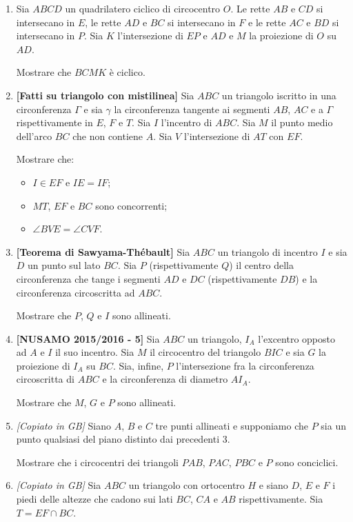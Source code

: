 \begin{enumerate}
	\item Sia $ABCD$ un quadrilatero ciclico di circocentro $O$. Le rette $AB$ e $CD$ si intersecano in $E$, le rette $AD$ e $BC$ si intersecano in $F$ e le rette $AC$ e $BD$ si intersecano in $P$. Sia $K$ l'intersezione di $EP$ e $AD$ e $M$ la proiezione di $O$ su $AD$.
	
	Mostrare che $BCMK$ è ciclico. 
	\item \textbf{[Fatti su triangolo con mistilinea]} Sia $ABC$ un triangolo iscritto in una circonferenza $\Gamma$ e sia $\gamma$ la circonferenza tangente ai segmenti $AB$, $AC$ e a $\Gamma$ rispettivamente in $E$, $F$ e $T$. Sia $I$ l'incentro di $ABC$. Sia $M$ il punto medio dell'arco $BC$ che non contiene $A$. Sia $V$ l'intersezione di $AT$ con $EF$. 
	
	Mostrare che:
	\begin{itemize}
		\item $I\in EF$ e $IE=IF$;
		\item $MT$, $EF$ e $BC$ sono concorrenti;
		\item $\angle BVE=\angle CVF$.
	\end{itemize}

	\item \textbf{[Teorema di Sawyama-Thébault]} 
	Sia $ABC$ un triangolo di incentro $I$ e sia $D$ un punto sul lato $BC$. Sia $P$ (rispettivamente $Q$) il centro della circonferenza che tange i segmenti $AD$ e $DC$ (rispettivamente $DB$) e la circonferenza circoscritta ad $ABC$. 
	
	Mostrare che $P$, $Q$ e $I$ sono allineati.
	\item \textbf{[NUSAMO 2015/2016 - 5]}
	Sia $ABC$ un triangolo, $I_A$ l'excentro opposto ad $A$
	e $I$ il suo incentro. Sia $M$ il circocentro del triangolo $BIC$ e sia $G$ la proiezione di $I_A$ su $BC$.
	Sia, infine, $P$ l'intersezione fra la circonferenza circoscritta di $ABC$ e la circonferenza di diametro $AI_A$. 
	
	Mostrare che $M$, $G$ e $P$ sono allineati.
	\item \emph{[Copiato in GB]} Siano $A$, $B$ e $C$ tre punti allineati e supponiamo che $P$ sia un punto qualsiasi del piano distinto dai precedenti 3. 
	
	Mostrare che i circocentri dei triangoli $PAB$, $PAC$, $PBC$ e $P$ sono conciclici.
	\item \emph{[Copiato in GB]} Sia $ABC$ un triangolo con ortocentro $H$ e siano $D$, $E$ e $F$ i piedi delle altezze che cadono sui lati $BC$, $CA$ e $AB$ rispettivamente. Sia $T=EF\cap BC$.
	

\end{enumerate}
